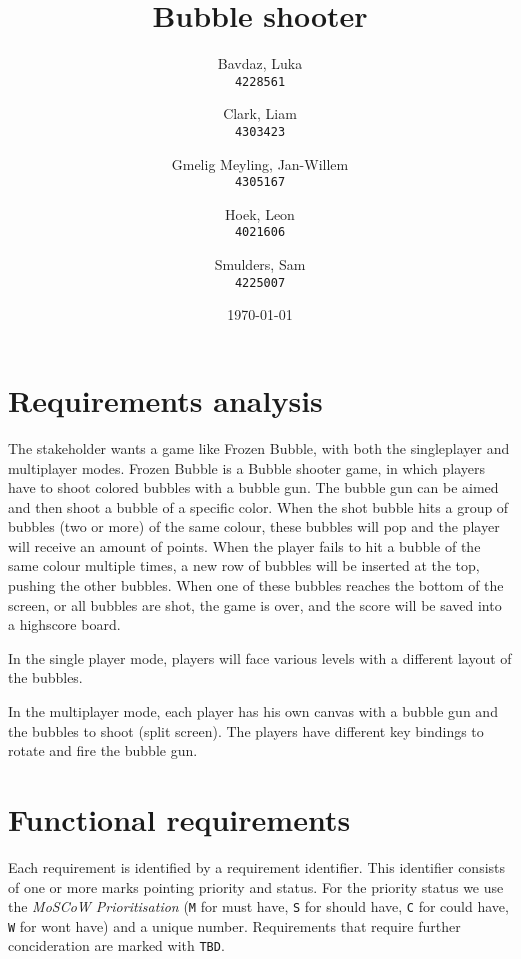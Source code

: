 \documentclass[a4paper]{article}
\title{Bubble shooter}
\author{
    Bavdaz, Luka\\
    \texttt{4228561}
    \and
    Clark, Liam\\
    \texttt{4303423}
    \and
    Gmelig Meyling, Jan-Willem\\
    \texttt{4305167}
    \and
    Hoek, Leon\\
    \texttt{4021606}
    \and
    Smulders, Sam\\
    \texttt{4225007}
}
\date{\today}
\begin{document}
\maketitle



\section{Requirements analysis}
The stakeholder wants a game like Frozen Bubble, with both the singleplayer and multiplayer modes. Frozen Bubble is a Bubble shooter game, in which players have to shoot colored bubbles with a bubble gun. The bubble gun can be aimed and then shoot a bubble of a specific color. When the shot bubble hits a group of bubbles (two or more) of the same colour, these bubbles will pop and the player will receive an amount of points. When the player fails to hit a bubble of the same colour multiple times, a new row of bubbles will be inserted at the top, pushing the other bubbles. When one of these bubbles reaches the bottom of the screen, or all bubbles are shot, the game is over, and the score will be saved into a highscore board.
\par In the single player mode, players will face various levels with a different layout of the bubbles.
\par In the multiplayer mode, each player has his own canvas with a bubble gun and the bubbles to shoot (split screen). The players have different key bindings to rotate and fire the bubble gun.

\section{Functional requirements}
Each requirement is identified by a requirement identifier. This identifier consists of one or more marks pointing priority and status. For the priority status we use the \textit{MoSCoW Prioritisation} \citep{moscow} (\texttt{M} for must have, \texttt{S} for should have, \texttt{C} for could have, \texttt{W} for wont have) and a unique number. Requirements that require further concideration are marked with \texttt{TBD}.
\end{document}
